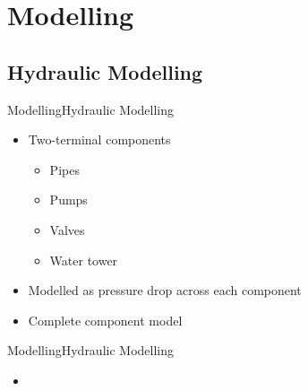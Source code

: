 \section{Modelling}



\subsection{Hydraulic Modelling}

\begin{frame}{Modelling}{Hydraulic Modelling}
\begin{itemize}
	\item<1-> Two-terminal components 
	\begin{itemize}
		\item<1-> Pipes 
		\item<1-> Pumps
		\item<1-> Valves
		\item<1-> Water tower
	\end{itemize}
	\item<1-> Modelled as pressure drop across each component
\end{itemize}

	\begin{itemize}
		\item<2-> Complete component model
	\end{itemize}

\end{frame}


\begin{frame}{Modelling}{Hydraulic Modelling}
\begin{itemize}
	\item<1-> 
\end{itemize}	
%  
\end{frame}

